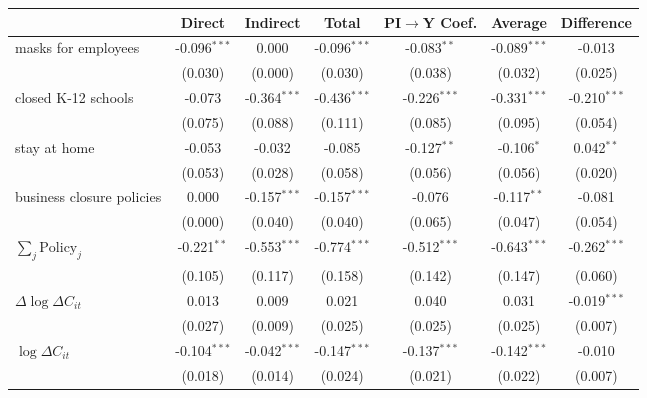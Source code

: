 
\begin{tabular}{lccccc|>{}c}
\toprule
  & Direct & Indirect & Total & PI$\to$Y Coef. & Average & Difference\\
\midrule
masks for employees & -0.096$^{***}$ & 0.000 & -0.096$^{***}$ & -0.083$^{**}$ & -0.089$^{***}$ & -0.013\\
 & (0.030) & (0.000) & (0.030) & (0.038) & (0.032) & (0.025)\\
closed K-12 schools & -0.073 & -0.364$^{***}$ & -0.436$^{***}$ & -0.226$^{***}$ & -0.331$^{***}$ & -0.210$^{***}$\\
 & (0.075) & (0.088) & (0.111) & (0.085) & (0.095) & (0.054)\\
stay at home & -0.053 & -0.032 & -0.085 & -0.127$^{**}$ & -0.106$^{*}$ & 0.042$^{**}$\\
 & (0.053) & (0.028) & (0.058) & (0.056) & (0.056) & (0.020)\\
business closure policies & 0.000 & -0.157$^{***}$ & -0.157$^{***}$ & -0.076 & -0.117$^{**}$ & -0.081\\
 & (0.000) & (0.040) & (0.040) & (0.065) & (0.047) & (0.054)\\
$\sum_j \mathrm{Policy}_j$ & -0.221$^{**}$ & -0.553$^{***}$ & -0.774$^{***}$ & -0.512$^{***}$ & -0.643$^{***}$ & -0.262$^{***}$\\
 & (0.105) & (0.117) & (0.158) & (0.142) & (0.147) & (0.060)\\
$\Delta \log \Delta C_{it}$ & 0.013 & 0.009 & 0.021 & 0.040 & 0.031 & -0.019$^{***}$\\
 & (0.027) & (0.009) & (0.025) & (0.025) & (0.025) & (0.007)\\
$\log \Delta C_{it}$ & -0.104$^{***}$ & -0.042$^{***}$ & -0.147$^{***}$ & -0.137$^{***}$ & -0.142$^{***}$ & -0.010\\
 & (0.018) & (0.014) & (0.024) & (0.021) & (0.022) & (0.007)\\
\bottomrule
\end{tabular}
